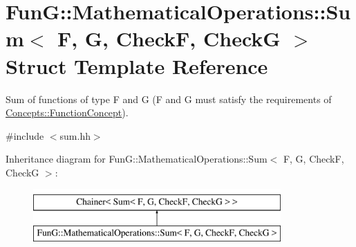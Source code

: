 \hypertarget{structFunG_1_1MathematicalOperations_1_1Sum}{\section{Fun\-G\-:\-:Mathematical\-Operations\-:\-:Sum$<$ F, G, Check\-F, Check\-G $>$ Struct Template Reference}
\label{structFunG_1_1MathematicalOperations_1_1Sum}
}


Sum of functions of type F and G (F and G must satisfy the requirements of \hyperlink{structFunG_1_1Concepts_1_1FunctionConcept}{Concepts\-::\-Function\-Concept}).  




{\ttfamily \#include $<$sum.\-hh$>$}

Inheritance diagram for Fun\-G\-:\-:Mathematical\-Operations\-:\-:Sum$<$ F, G, Check\-F, Check\-G $>$\-:\begin{figure}[H]
\begin{center}
\leavevmode
\includegraphics[height=2.000000cm]{structFunG_1_1MathematicalOperations_1_1Sum}
\end{center}
\end{figure}
